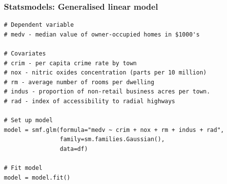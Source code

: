 \documentclass[pdf]{beamer}
\begin{document}
\begin{frame}[fragile]
\frametitle{Statsmodels: Generalised linear model}

\begin{lstlisting}[style=python]
# Dependent variable
# medv - median value of owner-occupied homes in $1000's

# Covariates
# crim - per capita crime rate by town
# nox - nitric oxides concentration (parts per 10 million)
# rm - average number of rooms per dwelling
# indus - proportion of non-retail business acres per town.
# rad - index of accessibility to radial highways

# Set up model
model = smf.glm(formula="medv ~ crim + nox + rm + indus + rad",
                family=sm.families.Gaussian(),
                data=df)

# Fit model
model = model.fit() 

\end{lstlisting}


\end{frame}
\end{document}
